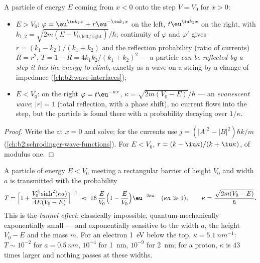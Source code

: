 \begin{proposition}\label{prop:b2:potential-wells-tunneling:step}
A particle of energy $E$ coming from $x < 0$ onto the step $V = V_0$
for $x > 0$:
\begin{itemize}
\item $E > V_0$: $\varphi = \eu^{\iu k_1x} + r\eu^{-\iu k_1x}$ on the left, $t\eu^{\iu
      k_2x}$ on the right, with $k_{1,2} = \sqrt{2m(E - V_{0,\text{left/right}})}/
      \hbar$; continuity of $\varphi$ and $\varphi'$ gives $r = (k_1 - k_2)/(k_1
      + k_2)$ and the reflection probability (ratio of currents) $R = r^2$,
      $T = 1 - R = 4k_1k_2/(k_1 + k_2)^2$ --- a particle \emph{can be
      reflected by a step it has the energy to climb}, exactly as a wave on
      a string by a change of impedance (\cref{ch:b2:wave-interfaces});
\item $E < V_0$: on the right $\varphi = t\eu^{-\kappa x}$, $\kappa = \sqrt{2m(V_0
      - E)}/\hbar$ --- an \emph{evanescent wave}; $|r| = 1$ (total reflection, with a phase shift), no
      current flows into the step, but the particle is found there with a
      probability decaying over $1/\kappa$.
\end{itemize}
\end{proposition}

\begin{proof}
Write the  at $x = 0$ and solve; for the currents
use $j = (|A|^2 - |B|^2)\hbar k/m$ (\cref{ch:b2:schrodinger-wave-functions}).
For $E < V_0$, $r = (k - \iu\kappa)/(k + \iu\kappa)$, of modulus one.
\end{proof}

\begin{theorem}\label{thm:b2:potential-wells-tunneling:tunnel}
A particle of energy $E < V_0$ meeting a rectangular barrier of height
$V_0$ and width $a$ is transmitted with the probability
\[
T = \Big[1 + \frac{V_0^2\sinh^2(\kappa a)}{4E(V_0 - E)}\Big]^{-1}
\ \approx\ 16\,\frac{E}{V_0}\Big(1 - \frac{E}{V_0}\Big)\eu^{-2\kappa a}
\quad (\kappa a \gg 1), \qquad
\kappa = \frac{\sqrt{2m(V_0 - E)}}{\hbar} .
\]
This is the \emph{tunnel effect}: classically
impossible, quantum-mechanically exponentially small --- and
exponentially sensitive to the width $a$, the height $V_0 - E$ and the
mass $m$. For an electron \qty{1}{eV} below the top, $\kappa = \qty{5.1}{nm^{-1}}$:
$T \sim 10^{-2}$ for $a = \qty{0.5}{nm}$, $10^{-4}$ for \qty{1}{nm}, $10^{-9}$ for
\qty{2}{nm}; for a proton, $\kappa$ is $43$ times larger and nothing passes
at these widths.
\end{theorem}

